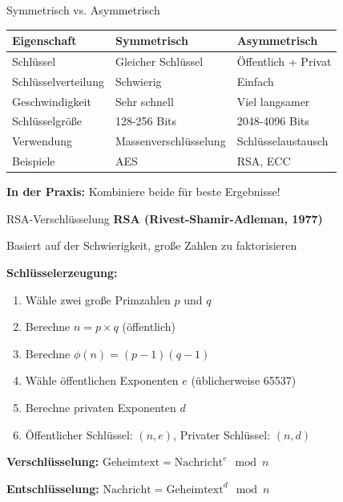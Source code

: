 \documentclass[handout]{beamer}
\begin{document}
\begin{frame}{Symmetrisch vs. Asymmetrisch}
\begin{center}
\begin{tabular}{|l|l|l|}
\hline
\textbf{Eigenschaft} & \textbf{Symmetrisch} & \textbf{Asymmetrisch} \\
\hline
Schlüssel & Gleicher Schlüssel & Öffentlich + Privat \\
Schlüsselverteilung & Schwierig & Einfach \\
Geschwindigkeit & Sehr schnell & Viel langsamer \\
Schlüsselgröße & 128-256 Bits & 2048-4096 Bits \\
Verwendung & Massenverschlüsselung & Schlüsselaustausch \\
Beispiele & AES & RSA, ECC \\
\hline
\end{tabular}
\end{center}

\vspace{0.3cm}
\textbf{In der Praxis:} Kombiniere beide für beste Ergebnisse!
\end{frame}

\begin{frame}{RSA-Verschlüsselung}
\textbf{RSA (Rivest-Shamir-Adleman, 1977)}

Basiert auf der Schwierigkeit, große Zahlen zu faktorisieren

\vspace{0.3cm}
\textbf{Schlüsselerzeugung:}
\begin{enumerate}
    \item Wähle zwei große Primzahlen $p$ und $q$
    \item Berechne $n = p \times q$ (öffentlich)
    \item Berechne $\phi(n) = (p-1)(q-1)$
    \item Wähle öffentlichen Exponenten $e$ (üblicherweise 65537)
    \item Berechne privaten Exponenten $d$
    \item Öffentlicher Schlüssel: $(n, e)$, Privater Schlüssel: $(n, d)$
\end{enumerate}

\vspace{0.3cm}
\textbf{Verschlüsselung:} $\text{Geheimtext} = \text{Nachricht}^e \mod n$

\textbf{Entschlüsselung:} $\text{Nachricht} = \text{Geheimtext}^d \mod n$

\end{frame}
\end{document}
